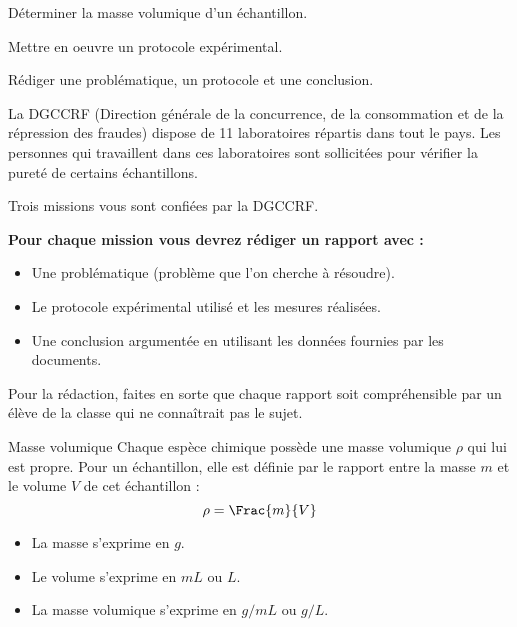 \teteSndCorp




\begin{objectifs}
  \item Déterminer la masse volumique d'un échantillon.
  \item Mettre en oeuvre un protocole expérimental.
  \item Rédiger une problématique, un protocole et une conclusion.
\end{objectifs}


\begin{encart}
  
  La \textsf{DGCCRF} (Direction générale de la concurrence, de la consommation et de la répression des fraudes) dispose de 11 laboratoires répartis dans tout le pays. 
  Les personnes qui travaillent dans ces laboratoires sont sollicitées pour vérifier la pureté de certains échantillons.
  
  Trois missions vous sont confiées par la \textsf{DGCCRF}.
\end{encart}

\textbf{\large \fleche Pour chaque mission vous devrez rédiger un rapport avec :}
\begin{itemize}
  \item Une problématique (problème que l'on cherche à résoudre).
  \item Le protocole expérimental utilisé et les mesures réalisées.
  \item Une conclusion argumentée en utilisant les données fournies par les documents.
\end{itemize}
{\large \fleche} Pour la rédaction, faites en sorte que chaque rapport soit compréhensible par un élève de la classe qui ne connaîtrait pas le sujet.


\begin{doc}{Masse volumique}
  Chaque espèce chimique possède une masse volumique $\rho$ qui lui est propre.
  Pour un échantillon, elle est définie par le rapport entre la masse $m$ et le volume $V$ de cet échantillon : 
  \begin{equation*}
    \rho = \Frac{m}{V}
  \end{equation*}
  \begin{itemize}
      \item La masse s'exprime en $\unit{g}$.
      \item Le volume s'exprime en $\unit{mL}$ ou $\unit{L}$.
      \item La masse volumique s'exprime en $\unit{g/mL}$ ou $\unit{g/L}$.
  \end{itemize}
\end{doc}

